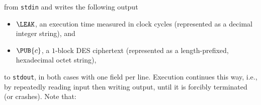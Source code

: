 \documentclass[crop={false},multi={true},tikz={true}]{standalone}
\begin{document}
\noindent
from \lstinline[language={bash}]{stdin} and writes the following output

\begin{itemize}
\item $\LEAK$,
      an execution time measured in clock cycles
      (represented as a                       decimal integer string),
      and
\item $\PUB{c}$,
      a  ${1}$-block DES ciphertext
      (represented as a  length-prefixed, hexadecimal octet   string), 
\end{itemize}

\noindent
to \lstinline[language={bash}]{stdout}, in both cases with one field per 
line.  Execution continues this way, i.e., by repeatedly reading input 
then writing output, until it is forcibly terminated (or crashes).  
Note that:
\end{document}
